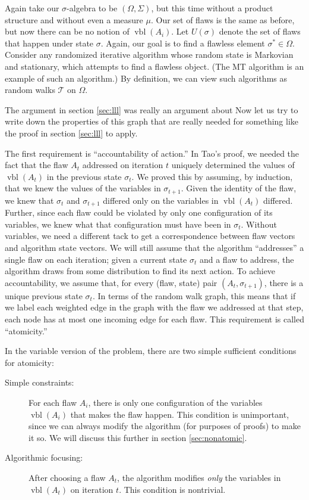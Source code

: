 \documentclass[twocolumn]{article}
\begin{document}
Again take our $\sigma$-algebra to be $(\Omega, \Sigma)$, but this time without a product structure and without even a measure $\mu$.  Our set of flaws is the same as before, but now there can be no notion of $\operatorname{vbl}(A_i)$.  Let $U(\sigma)$ denote the set of flaws that happen under state $\sigma$.  Again, our goal is to find a flawless element $\sigma^* \in \Omega$.  Consider any randomized iterative algorithm whose random state is Markovian and stationary, which attempts to find a flawless object.  (The MT algorithm is an example of such an algorithm.)  By definition, we can view such algorithms as random walks $\mathcal{T}$ on $\Omega$.

The argument in section \ref{sec:lll} was really an argument about %
Now let us try to write down the properties of this graph that are really needed for something like the proof in section \ref{sec:lll} to apply.

The first requirement is ``accountability of action.''  In Tao's proof, we needed the fact that the flaw $A_t$ addressed on iteration $t$ uniquely determined the values of $\operatorname{vbl}(A_t)$ in the previous state $\sigma_t$.  We proved this by assuming, by induction, that we knew the values of the variables in $\sigma_{t+1}$.  Given the identity of the flaw, we knew that $\sigma_t$ and $\sigma_{t+1}$ differed only on the variables in $\operatorname{vbl}(A_t)$ differed.  Further, since each flaw could be violated by only one configuration of its variables, we knew what that configuration must have been in $\sigma_t$.  Without variables, we need a different tack to get a correspondence between flaw vectors and algorithm state vectors.  We will still assume that the algorithm ``addresses'' a single flaw on each iteration; given a current state $\sigma_t$ and a flaw to address, the algorithm draws from some distribution to find its next action.  To achieve accountability, we assume that, for every (flaw, state) pair $(A_{t}, \sigma_{t+1})$, there is a unique previous state $\sigma_t$.  In terms of the random walk graph, this means that if we label each weighted edge in the graph with the flaw we addressed at that step, each node has at most one incoming edge for each flaw.  This requirement is called ``atomicity.''

In the variable version of the problem, there are two simple sufficient conditions for atomicity:
\begin{description}
  \item[Simple constraints:] For each flaw $A_i$, there is only one configuration of the variables $\operatorname{vbl}(A_i)$ that makes the flaw happen.  This condition is unimportant, since we can always modify the algorithm (for purposes of proofs) to make it so.  We will discuss this further in section \ref{sec:nonatomic}.
  \item[Algorithmic focusing:] After choosing a flaw $A_t$, the algorithm modifies \emph{only} the variables in $\operatorname{vbl}(A_t)$ on iteration $t$.  This condition is nontrivial.
\end{description}
\end{document}

